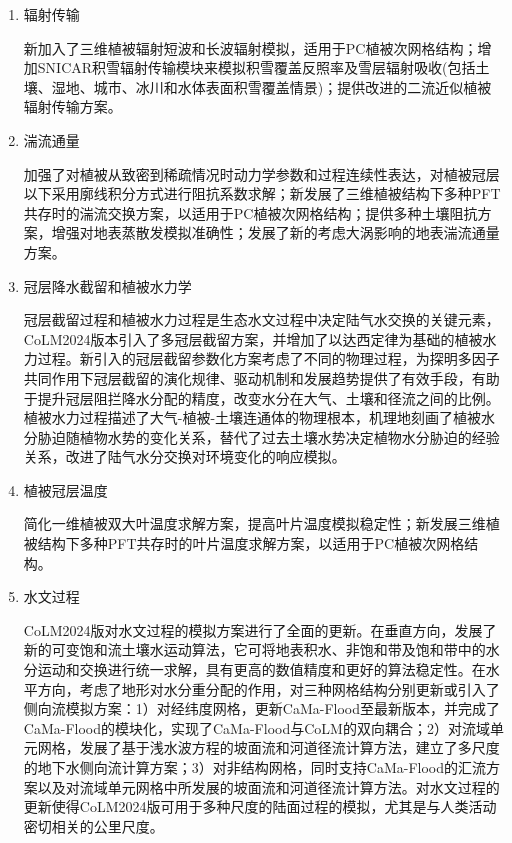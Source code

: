 \begin{enumerate}[label={\arabic*)}]
\item 辐射传输

  新加入了三维植被辐射短波\citep{yuan20143d}和长波辐射模拟，适用于PC植被次网格结构\citep{dai2019different}；增加SNICAR积雪辐射传输模块来模拟积雪覆盖反照率及雪层辐射吸收(包括土壤、湿地、城市、冰川和水体表面积雪覆盖情景)；提供改进的二流近似植被辐射传输方案\citep{yuan2017reexamination}。

\item 湍流通量

  加强了对植被从致密到稀疏情况时动力学参数和过程连续性表达，对植被冠层以下采用廓线积分方式进行阻抗系数求解；新发展了三维植被结构下多种PFT共存时的湍流交换方案，以适用于PC植被次网格结构；提供多种土壤阻抗方案，增强对地表蒸散发模拟准确性；发展了新的考虑大涡影响的地表湍流通量方案。

\item 冠层降水截留和植被水力学

  冠层截留过程和植被水力过程是生态水文过程中决定陆气水交换的关键元素，CoLM2024版本引入了多冠层截留方案，并增加了以达西定律为基础的植被水力过程。新引入的冠层截留参数化方案考虑了不同的物理过程，为探明多因子共同作用下冠层截留的演化规律、驱动机制和发展趋势提供了有效手段，有助于提升冠层阻拦降水分配的精度，改变水分在大气、土壤和径流之间的比例。植被水力过程描述了大气-植被-土壤连通体的物理根本，机理地刻画了植被水分胁迫随植物水势的变化关系，替代了过去土壤水势决定植物水分胁迫的经验关系，改进了陆气水分交换对环境变化的响应模拟。

\item 植被冠层温度

  简化一维植被双大叶温度求解方案，提高叶片温度模拟稳定性；新发展三维植被结构下多种PFT共存时的叶片温度求解方案，以适用于PC植被次网格结构。

\item 水文过程

  CoLM2024版对水文过程的模拟方案进行了全面的更新。在垂直方向，发展了新的可变饱和流土壤水运动算法，它可将地表积水、非饱和带及饱和带中的水分运动和交换进行统一求解，具有更高的数值精度和更好的算法稳定性。在水平方向，考虑了地形对水分重分配的作用，对三种网格结构分别更新或引入了侧向流模拟方案：1）对经纬度网格，更新CaMa-Flood至最新版本，并完成了CaMa-Flood的模块化，实现了CaMa-Flood与CoLM的双向耦合；2）对流域单元网格，发展了基于浅水波方程的坡面流和河道径流计算方法，建立了多尺度的地下水侧向流计算方案；3）对非结构网格，同时支持CaMa-Flood的汇流方案以及对流域单元网格中所发展的坡面流和河道径流计算方法。对水文过程的更新使得CoLM2024版可用于多种尺度的陆面过程的模拟，尤其是与人类活动密切相关的公里尺度。


\end{enumerate}
